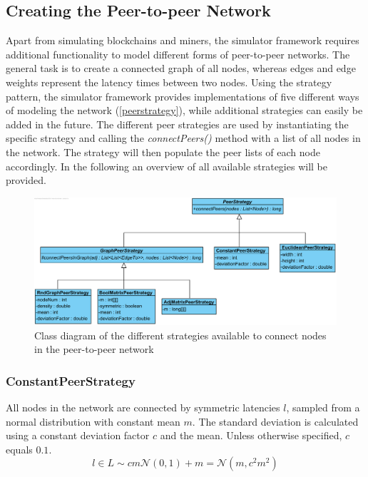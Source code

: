 \documentclass[a4paper,12pt,twoside]{report}
\begin{document}
\subsection{Creating the Peer-to-peer Network} \label{peerstratsection}
Apart from simulating blockchains and miners, the simulator framework requires additional functionality to model different forms of peer-to-peer networks. The general task is to create a connected graph of all nodes, whereas edges and edge weights represent the latency times between two nodes. Using the strategy pattern\cite{strategy}, the simulator framework provides implementations of five different ways of modeling the network (\autoref{peerstrategy}), while additional strategies can easily be added in the future. The different peer strategies are used by instantiating the specific strategy and calling the \textit{connectPeers()} method with a list of all nodes in the network. The strategy will then populate the peer lists of each node accordingly. In the following an overview of all available strategies will be provided.
\begin{figure}[ht]
	\centering
  \includegraphics[width=\textwidth]{PeerStrategy.png}
	\caption{Class diagram of the different strategies available to connect nodes in the peer-to-peer network}
	\label{peerstrategy}
\end{figure}
\subsubsection{ConstantPeerStrategy}
All nodes in the network are connected by symmetric latencies $l$, sampled from a normal distribution with constant mean $m$. The standard deviation is calculated using a constant deviation factor $c$ and the mean. Unless otherwise specified, $c$ equals $0.1$.
\begin{equation}\label{distribution} 
l\in L\sim cm\mathcal{N}(0,1)+m = \mathcal{N}(m,c^{2}m^{2})
\end{equation}
\end{document}
